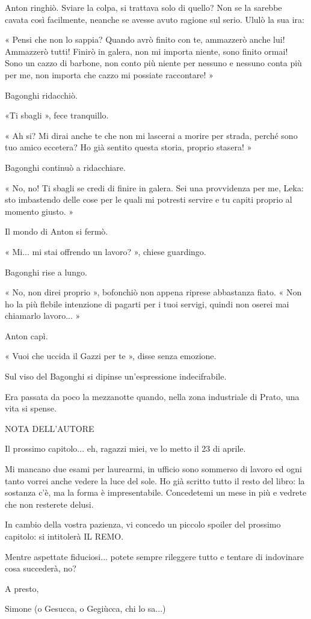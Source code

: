 Anton ringhiò. Sviare la colpa, si trattava solo di quello? Non se la sarebbe cavata così facilmente, neanche se avesse avuto ragione sul serio. Ululò la sua ira:

« Pensi che non lo sappia? Quando avrò finito con te, ammazzerò anche lui! Ammazzerò tutti! Finirò in galera, non mi importa niente, sono finito ormai! Sono un cazzo di barbone, non conto più niente per nessuno e nessuno conta più per me, non importa che cazzo mi possiate raccontare! »

Bagonghi ridacchiò.

«Ti sbagli », fece tranquillo.

« Ah si? Mi dirai anche te che non mi lascerai a morire per strada, perché sono tuo amico eccetera? Ho già sentito questa storia, proprio stasera! »

Bagonghi continuò a ridacchiare.

« No, no! Ti sbagli se credi di finire in galera. Sei una provvidenza per me, Leka: sto imbastendo delle cose per le quali mi potresti servire e tu capiti proprio al momento giusto. »

Il mondo di Anton si fermò.

« Mi... mi stai offrendo un lavoro? », chiese guardingo.

Bagonghi rise a lungo.

« No, non direi proprio », bofonchiò non appena riprese abbastanza fiato. « Non ho la più flebile intenzione di pagarti per i tuoi servigi, quindi non oserei mai chiamarlo lavoro... »

Anton capì.

« Vuoi che uccida il Gazzi per te », disse senza emozione.

Sul viso del Bagonghi si dipinse un'espressione indecifrabile.

Era passata da poco la mezzanotte quando, nella zona industriale di Prato, una vita si spense.


NOTA DELL'AUTORE

Il prossimo capitolo... eh, ragazzi miei, ve lo metto il 23 di aprile.

Mi mancano due esami per laurearmi, in ufficio sono sommerso di lavoro ed ogni tanto vorrei anche vedere la luce del sole. Ho già scritto tutto il resto del libro: la sostanza c'è, ma la forma è impresentabile. Concedetemi un mese in più e vedrete che non resterete delusi.

In cambio della vostra pazienza, vi concedo un piccolo spoiler del prossimo capitolo: si intitolerà IL REMO.

Mentre aspettate fiduciosi... potete sempre rileggere tutto e tentare di indovinare cosa succederà, no?

A presto,

Simone (o Gesucca, o Gegiùcca, chi lo sa...)



